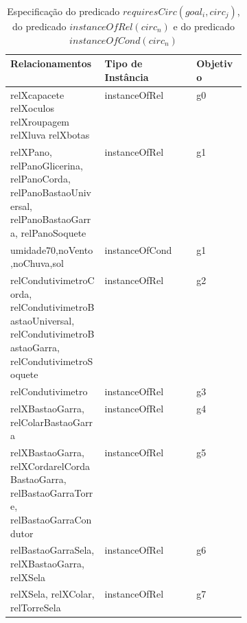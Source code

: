 \begin{center}
\begin{longtable}[H]{|p{0.4\linewidth}|l|l|}
\caption{Especificação do predicado $requiresCirc(goal_i,circ_j)$, do predicado $instanceOfRel(circ_n)$ e do predicado $instanceOfCond(circ_n)$} \label{relationsgroup1} \\
\hline
\textbf{Relacionamentos}																									& \textbf{Tipo de Instância}          & \textbf{Objetivo} \\ \hline
relXcapacete relXoculos relXroupagem relXluva relXbotas                                                                                                                                                                                                                                                                    & instanceOfRel              		 & g0         \\ \hline
relXPano, relPanoGlicerina, relPanoCorda, relPanoBastaoUniversal, relPanoBastaoGarra, relPanoSoquete                             						& instanceOfRel                       & g1         \\ \hline
umidade70,noVento,noChuva,sol 																														& instanceOfCond					  & g1        \\ \hline
relCondutivimetroCorda, relCondutivimetroBastaoUniversal, relCondutivimetroBastaoGarra, relCondutivimetroSoquete               						& instanceOfRel              		 & g2         \\ \hline
relCondutivimetro                                                                                                           						& instanceOfRel              		 & g3         \\ \hline
relXBastaoGarra, relColarBastaoGarra                                                                                         						& instanceOfRel              		 & g4         \\ \hline
relXBastaoGarra, relXCordarelCordaBastaoGarra, relBastaoGarraTorre, relBastaoGarraCondutor                                     						& instanceOfRel              		 & g5         \\ \hline
relBastaoGarraSela, relXBastaoGarra, relXSela                                                                                 						& instanceOfRel              		 & g6         \\ \hline
relXSela, relXColar, relTorreSela                                                                                             						& instanceOfRel              		 & g7         \\ \hline

\end{longtable}
\end{center}
